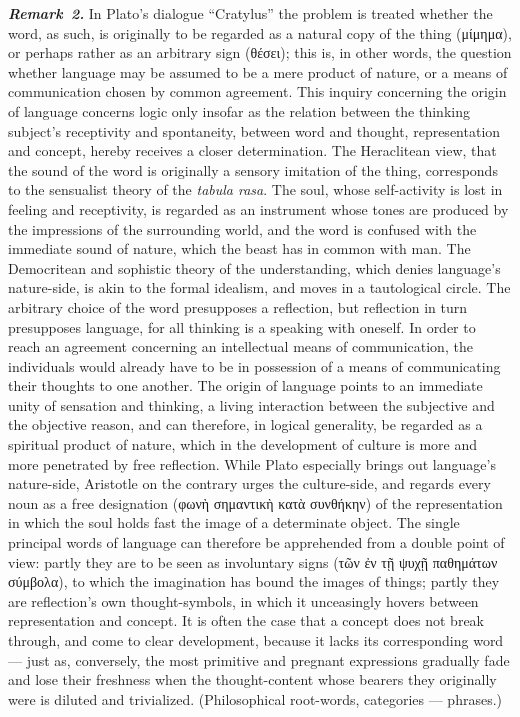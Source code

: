 \documentclass[12pt]{book}
\newcommand{\anm}[1]{\emph{\textbf{Remark~#1.}}}
\begin{document}
\anm{2} In Plato's dialogue ``Cratylus'' the problem is treated whether the
word, as such, is originally to be regarded as a natural copy of the thing
(μίμημα), or perhaps rather as an arbitrary sign (θέσει); this is, in other
words, the question whether language may be assumed to be a mere product of
nature, or a means of communication chosen by common agreement. This inquiry
concerning the origin of language concerns logic only insofar as the
relation between the thinking subject's receptivity and spontaneity, between
word and thought, representation and concept, hereby receives a closer
determination. The Heraclitean view, that the sound of the word is
originally a sensory imitation of the thing, corresponds to the sensualist
theory of the \textit{tabula rasa}. The soul, whose self-activity is lost in
feeling and receptivity, is regarded as an instrument whose tones are
produced by the impressions of the surrounding world, and the word is
confused with the immediate sound of nature, which the beast has in common
with man. The Democritean and sophistic theory of the understanding, which
denies language's nature-side, is akin to the formal idealism, and moves in
a tautological circle. The arbitrary choice of the word presupposes a
reflection, but reflection in turn presupposes language, for all thinking is
a speaking with oneself. In order to reach an agreement concerning an
intellectual means of communication, the individuals would already have to
be in possession of a means of communicating their thoughts to one another.
The origin of language points to an immediate unity of sensation and
thinking, a living interaction between the subjective and the objective
reason, and can therefore, in logical generality, be regarded as a spiritual
product of nature, which in the development of culture is more and more
penetrated by free reflection. While Plato especially brings out language's
nature-side, Aristotle on the contrary urges the culture-side, and regards
every noun as a free designation (φωνὴ σημαντικὴ κατὰ συνθήκην) of the
representation in which the soul holds fast the image of a determinate
object. The single principal words of language can therefore be apprehended
from a double point of view: partly they are to be seen as involuntary signs
(τῶν ἐν τῇ ψυχῇ παθημάτων σύμβολα), to which the imagination has bound the
images of things; partly they are reflection's own thought-symbols, in which
it unceasingly hovers between representation and concept. It is often the
case that a concept does not break through, and come to clear development,
because it lacks its corresponding word --- just as, conversely, the most
primitive and pregnant expressions gradually fade and lose their freshness
when the thought-content whose bearers they originally were is diluted and
trivialized. (Philosophical root-words, categories --- phrases.)
\end{document}

